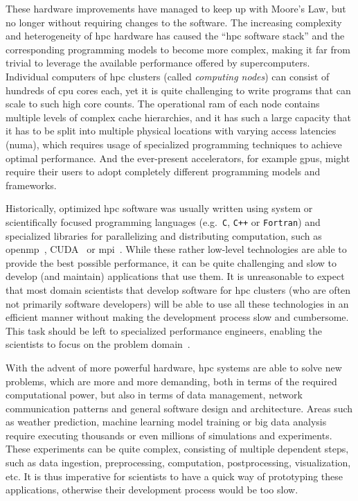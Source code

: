 These hardware improvements have managed to keep up with Moore's Law, but no longer without
requiring changes to the software. The increasing complexity and heterogeneity of
\gls{hpc} hardware has caused the ``\gls{hpc} software stack'' and the
corresponding programming models to become more complex, making it far from trivial to leverage the
available performance offered by supercomputers. Individual computers of \gls{hpc}
clusters (called \emph{computing nodes}) can consist of hundreds of \gls{cpu} cores
each, yet it is quite challenging to write programs that can scale to such high core counts. The
operational \gls{ram} of each node contains multiple levels of complex cache
hierarchies, and it has such a large capacity that it has to be split into multiple physical
locations with varying access latencies (\gls{numa}), which requires usage of
specialized programming techniques to achieve optimal performance. And the ever-present
accelerators, for example \glspl{gpu}, might require their users to adopt completely
different programming models and frameworks.

Historically, optimized \gls{hpc} software was usually written using system or
scientifically focused programming languages (e.g.~\texttt{C}, \texttt{C++}
or \texttt{Fortran}) and specialized libraries for parallelizing and distributing
computation, such as \gls{openmp}~\cite{openmp}, CUDA~\cite{cuda} or
\gls{mpi}~\cite{mpistudy}. While these rather low-level technologies are able
to provide the best possible performance, it can be quite challenging and slow to develop (and
maintain) applications that use them. It is unreasonable to expect that most domain scientists that
develop software for \gls{hpc} clusters (who are often not primarily software
developers) will be able to use all these technologies in an efficient manner without making the
development process slow and cumbersome. This task should be left to specialized performance
engineers, enabling the scientists to focus on the problem domain~\cite{dace}.

With the advent of more powerful hardware, \gls{hpc} systems are able to solve new
problems, which are more and more demanding, both in terms of the required computational power, but
also in terms of data management, network communication patterns and general software design and
architecture. Areas such as weather prediction, machine learning model training or big data
analysis require executing thousands or even millions of simulations and experiments. These
experiments can be quite complex, consisting of multiple dependent steps, such as data ingestion,
preprocessing, computation, postprocessing, visualization, etc. It is thus imperative for
scientists to have a quick way of prototyping these applications, otherwise their development
process would be too slow.

